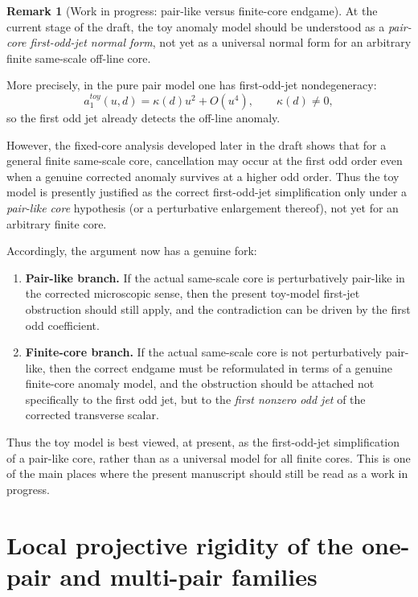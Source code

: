 \documentclass[11pt,a4paper]{amsart}
\def\toy{toy}%
\theoremstyle{plain}
\theoremstyle{definition}
\newtheorem{remark}[theorem]{Remark}
\newcommand{\toy}{\mathrm{toy}}
\begin{document}
\begin{remark}[Work in progress: pair-like versus finite-core endgame]
\label{rem:wip-pairlike-finitecore}
At the current stage of the draft, the toy anomaly model should be understood
as a \emph{pair-core first-odd-jet normal form}, not yet as a universal normal
form for an arbitrary finite same-scale off-line core.

More precisely, in the pure pair model one has first-odd-jet nondegeneracy:
\[
a_1^{\toy}(u,d)=\kappa(d)u^2+O(u^4),
\qquad
\kappa(d)\neq 0,
\]
so the first odd jet already detects the off-line anomaly.

However, the fixed-core analysis developed later in the draft shows that for
a general finite same-scale core, cancellation may occur at the first odd
order even when a genuine corrected anomaly survives at a higher odd order.
Thus the toy model is presently justified as the correct first-odd-jet
simplification only under a \emph{pair-like core} hypothesis (or a
perturbative enlargement thereof), not yet for an arbitrary finite core.

Accordingly, the argument now has a genuine fork:
\begin{enumerate}
\item \textbf{Pair-like branch.}
If the actual same-scale core is perturbatively pair-like in the corrected
microscopic sense, then the present toy-model first-jet obstruction should
still apply, and the contradiction can be driven by the first odd coefficient.

\item \textbf{Finite-core branch.}
If the actual same-scale core is not perturbatively pair-like, then the
correct endgame must be reformulated in terms of a genuine finite-core
anomaly model, and the obstruction should be attached not specifically to the
first odd jet, but to the \emph{first nonzero odd jet} of the corrected
transverse scalar.
\end{enumerate}

Thus the toy model is best viewed, at present, as the first-odd-jet
simplification of a pair-like core, rather than as a universal model for all
finite cores. This is one of the main places where the present manuscript
should still be read as a work in progress.
\end{remark}

\section{Local projective rigidity of the one-pair and multi-pair families}
\label{sec:projective-rigidity}
\end{document}
